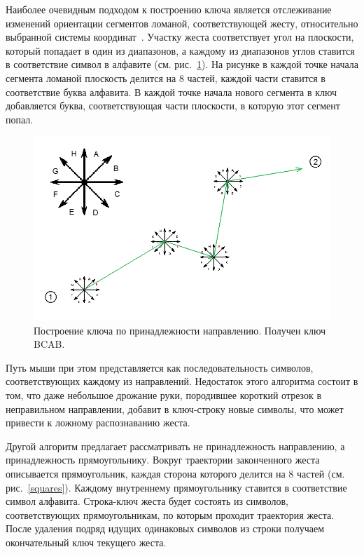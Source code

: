 \documentclass[a5paper]{article}
\begin{document}
Наиболее очевидным подходом к построению ключа является отслеживание изменений ориентации сегментов ломаной, соответствующей жесту, относительно выбранной системы координат~\cite{chaosAlgorithm}. Участку жеста соответствует угол на плоскости, который попадает в один из диапазонов, а каждому из диапазонов углов ставится в соответствие символ в алфавите (см. рис.~\ref{chaos}). На рисунке в каждой точке начала сегмента ломаной плоскость делится на 8 частей, каждой части ставится в соответствие буква алфавита. В каждой точке начала нового сегмента в ключ добавляется буква, соответствующая части плоскости, в которую этот сегмент попал.

\begin{figure} [ht]
  \begin{center}
    \includegraphics[width=1.2\textwidth, bb=0 0 804 498]{02-chaos.png}
    \caption{Построение ключа по принадлежности направлению. Получен ключ BCAB.}
    \label{chaos}
  \end{center}
\end{figure}

Путь мыши при этом представляется как последовательность символов, соответствующих каждому из направлений. Недостаток этого алгоритма состоит в том, что даже небольшое дрожание руки, породившее короткий отрезок в неправильном направлении, добавит в ключ-строку новые символы, что может привести к ложному распознаванию жеста.

Другой алгоритм предлагает рассматривать не принадлежность направлению, а принадлежность прямоугольнику. Вокруг траектории законченного жеста описывается прямоугольник, каждая сторона которого делится на 8 частей (см. рис.~\ref{squares}). Каждому внутреннему прямоугольнику ставится в соответствие символ алфавита. Строка-ключ жеста будет состоять из символов, соответствующих прямоугольникам, по которым проходит траектория жеста. После удаления подряд идущих одинаковых символов из строки получаем окончательный ключ текущего жеста. 
\end{document}
